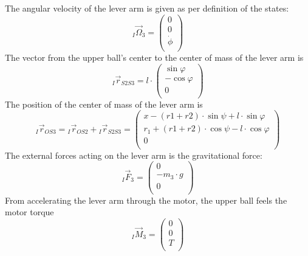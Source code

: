 \documentclass{article}
\begin{document}
The angular velocity of the lever arm is given as per definition of the states:
\begin{equation}
{}_I \vec{\Omega}_3 = 
\left( {\begin{array}{c} 0 \\ 0 \\ \dot{\phi} \\ \end{array} } \right)
\end{equation}
The vector from the upper ball's center to the center of mass of the lever arm is
\begin{equation}
{}_I \vec{r}_{S2S3} = 
l \cdot \left( {\begin{array}{c} \sin{\varphi} \\ -\cos{\varphi} \\ 0 \\ \end{array} } \right)
\end{equation}
The position of the center of mass of the lever arm is
\begin{equation}
{}_I \vec{r}_{OS3} = {}_I \vec{r}_{OS2} + {}_I \vec{r}_{S2S3} =
\left( {\begin{array}{c} x - (r1+r2) \cdot \sin{\psi} + l \cdot \sin{\varphi} \\ r_1 + (r1+r2) \cdot \cos{\psi} - l \cdot \cos{\varphi} \\ 0 \\ \end{array} } \right)
\end{equation} 
The external forces acting on the lever arm is the gravitational force:
\begin{equation}
{}_I \vec{F}_{3} = \left( {\begin{array}{c} 0 \\ -m_3 \cdot g \\ 0 \\ \end{array} } \right)
\end{equation}
From accelerating the lever arm through the motor, the upper ball feels the motor torque
\begin{equation}
{}_I \vec{M}_{3} = \left( {\begin{array}{c} 0 \\ 0 \\ T \\ \end{array} } \right)
\end{equation}
\end{document}
